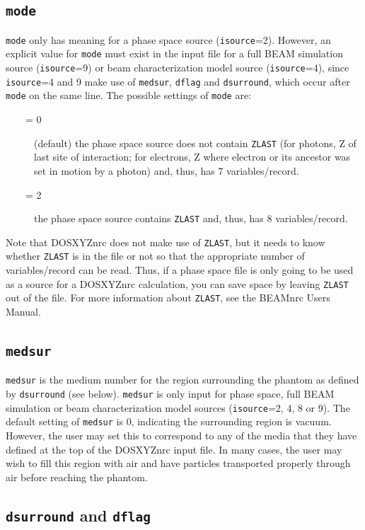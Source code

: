 \documentclass[12pt,twoside]{article}      %
\newcommand{\indexm}[1]{\index{#1}}
\begin{document}
\subsection {{\tt mode}}
\indexm{mode}
{\tt mode} only has meaning for a phase space source ({\tt isource}=2).
However, an explicit value for {\tt mode} must exist in the input file
for a full BEAM simulation source ({\tt isource}=9) or
beam characterization model source ({\tt isource}=4), since
{\tt isource}=4 and 9 make use of {\tt medsur}, {\tt dflag} and {\tt dsurround},
which occur after {\tt mode} on the same line.
The possible settings of {\tt mode} are:
\begin{description}
\item [~~~~= 0] (default) the phase space source does not contain
{\tt ZLAST} (for photons, Z of last site of interaction; for electrons,
Z where electron or its ancestor was set in motion by a photon) and, thus,
has 7 variables/record.
\item [~~~~= 2] the phase space source contains {\tt ZLAST} and, thus,
has 8 variables/record.
\end{description}

Note that DOSXYZnrc does not make use of {\tt ZLAST}, but it needs to know
whether {\tt ZLAST} is in the file or not so that the appropriate number
of variables/record can be read.  Thus, if a phase space file is only
going to be used as a source for a DOSXYZnrc calculation, you can save space
by leaving {\tt ZLAST} out of the file.  For more information
about {\tt ZLAST}, see the BEAMnrc Users Manual\cite{Ro09}.

\subsection {{\tt medsur}}
\indexm{medsur}
{\tt medsur} is the medium number for the region surrounding the phantom
as defined by {\tt dsurround}
(see below).  {\tt medsur} is only input for phase space, full BEAM
simulation or beam characterization
model sources ({\tt isource}=2, 4, 8 or 9).  The default setting of {\tt medsur}
is 0, indicating the
surrounding region is vacuum.  However, the user may set this to correspond
to any of the media that they have defined at the top of the DOSXYZnrc input file.
In many cases, the user may wish to fill this region with air and have particles
transported properly through air before reaching the phantom.

\subsection{{\tt dsurround} and {\tt dflag}}
\label{dflagsect}
\indexm{dsurround}
\indexm{dflag}
\end{document}
